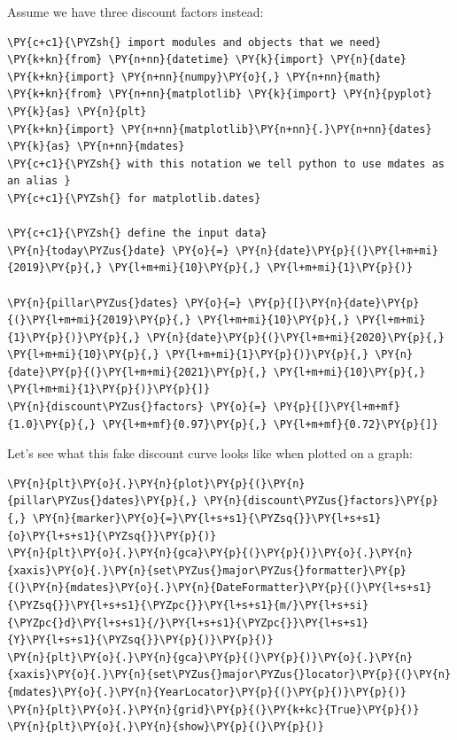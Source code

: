 Assume we have three discount factors instead:
\begin{tcolorbox}[breakable, size=fbox, boxrule=1pt, pad at break*=1mm,colback=cellbackground, colframe=cellborder]
\begin{Verbatim}[commandchars=\\\{\}]
\PY{c+c1}{\PYZsh{} import modules and objects that we need}
\PY{k+kn}{from} \PY{n+nn}{datetime} \PY{k}{import} \PY{n}{date}
\PY{k+kn}{import} \PY{n+nn}{numpy}\PY{o}{,} \PY{n+nn}{math}
\PY{k+kn}{from} \PY{n+nn}{matplotlib} \PY{k}{import} \PY{n}{pyplot} \PY{k}{as} \PY{n}{plt}
\PY{k+kn}{import} \PY{n+nn}{matplotlib}\PY{n+nn}{.}\PY{n+nn}{dates} \PY{k}{as} \PY{n+nn}{mdates} 
\PY{c+c1}{\PYZsh{} with this notation we tell python to use mdates as an alias }
\PY{c+c1}{\PYZsh{} for matplotlib.dates}

\PY{c+c1}{\PYZsh{} define the input data}
\PY{n}{today\PYZus{}date} \PY{o}{=} \PY{n}{date}\PY{p}{(}\PY{l+m+mi}{2019}\PY{p}{,} \PY{l+m+mi}{10}\PY{p}{,} \PY{l+m+mi}{1}\PY{p}{)}

\PY{n}{pillar\PYZus{}dates} \PY{o}{=} \PY{p}{[}\PY{n}{date}\PY{p}{(}\PY{l+m+mi}{2019}\PY{p}{,} \PY{l+m+mi}{10}\PY{p}{,} \PY{l+m+mi}{1}\PY{p}{)}\PY{p}{,} \PY{n}{date}\PY{p}{(}\PY{l+m+mi}{2020}\PY{p}{,} \PY{l+m+mi}{10}\PY{p}{,} \PY{l+m+mi}{1}\PY{p}{)}\PY{p}{,} \PY{n}{date}\PY{p}{(}\PY{l+m+mi}{2021}\PY{p}{,} \PY{l+m+mi}{10}\PY{p}{,} \PY{l+m+mi}{1}\PY{p}{)}\PY{p}{]}
\PY{n}{discount\PYZus{}factors} \PY{o}{=} \PY{p}{[}\PY{l+m+mf}{1.0}\PY{p}{,} \PY{l+m+mf}{0.97}\PY{p}{,} \PY{l+m+mf}{0.72}\PY{p}{]}
\end{Verbatim}
\end{tcolorbox}
    
Let's see what this fake discount curve looks like when plotted on a graph:

\begin{tcolorbox}[breakable, size=fbox, boxrule=1pt, pad at break*=1mm,colback=cellbackground, colframe=cellborder]
\begin{Verbatim}[commandchars=\\\{\}]
\PY{n}{plt}\PY{o}{.}\PY{n}{plot}\PY{p}{(}\PY{n}{pillar\PYZus{}dates}\PY{p}{,} \PY{n}{discount\PYZus{}factors}\PY{p}{,} \PY{n}{marker}\PY{o}{=}\PY{l+s+s1}{\PYZsq{}}\PY{l+s+s1}{o}\PY{l+s+s1}{\PYZsq{}}\PY{p}{)}
\PY{n}{plt}\PY{o}{.}\PY{n}{gca}\PY{p}{(}\PY{p}{)}\PY{o}{.}\PY{n}{xaxis}\PY{o}{.}\PY{n}{set\PYZus{}major\PYZus{}formatter}\PY{p}{(}\PY{n}{mdates}\PY{o}{.}\PY{n}{DateFormatter}\PY{p}{(}\PY{l+s+s1}{\PYZsq{}}\PY{l+s+s1}{\PYZpc{}}\PY{l+s+s1}{m/}\PY{l+s+si}{\PYZpc{}d}\PY{l+s+s1}{/}\PY{l+s+s1}{\PYZpc{}}\PY{l+s+s1}{Y}\PY{l+s+s1}{\PYZsq{}}\PY{p}{)}\PY{p}{)}
\PY{n}{plt}\PY{o}{.}\PY{n}{gca}\PY{p}{(}\PY{p}{)}\PY{o}{.}\PY{n}{xaxis}\PY{o}{.}\PY{n}{set\PYZus{}major\PYZus{}locator}\PY{p}{(}\PY{n}{mdates}\PY{o}{.}\PY{n}{YearLocator}\PY{p}{(}\PY{p}{)}\PY{p}{)}
\PY{n}{plt}\PY{o}{.}\PY{n}{grid}\PY{p}{(}\PY{k+kc}{True}\PY{p}{)}
\PY{n}{plt}\PY{o}{.}\PY{n}{show}\PY{p}{(}\PY{p}{)}
\end{Verbatim}
\end{tcolorbox}

